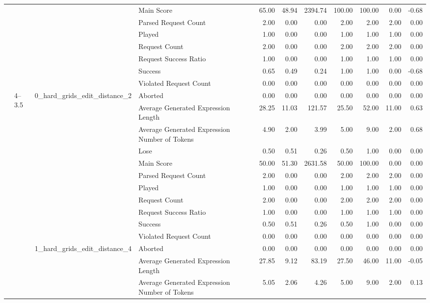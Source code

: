 \begin{tabular}{llllrrrrrrr}
 &  &  & Main Score & 65.00 & 48.94 & 2394.74 & 100.00 & 100.00 & 0.00 & -0.68 \\
 &  &  & Parsed Request Count & 2.00 & 0.00 & 0.00 & 2.00 & 2.00 & 2.00 & 0.00 \\
 &  &  & Played & 1.00 & 0.00 & 0.00 & 1.00 & 1.00 & 1.00 & 0.00 \\
 &  &  & Request Count & 2.00 & 0.00 & 0.00 & 2.00 & 2.00 & 2.00 & 0.00 \\
 &  &  & Request Success Ratio & 1.00 & 0.00 & 0.00 & 1.00 & 1.00 & 1.00 & 0.00 \\
 &  &  & Success & 0.65 & 0.49 & 0.24 & 1.00 & 1.00 & 0.00 & -0.68 \\
 &  &  & Violated Request Count & 0.00 & 0.00 & 0.00 & 0.00 & 0.00 & 0.00 & 0.00 \\
\cline{2-11} \cline{3-11}
 & \multirow[t]{22}{*}{4--3.5} & \multirow[t]{11}{*}{0_hard_grids_edit_distance_2} & Aborted & 0.00 & 0.00 & 0.00 & 0.00 & 0.00 & 0.00 & 0.00 \\
 &  &  & Average Generated Expression Length & 28.25 & 11.03 & 121.57 & 25.50 & 52.00 & 11.00 & 0.63 \\
 &  &  & Average Generated Expression Number of Tokens & 4.90 & 2.00 & 3.99 & 5.00 & 9.00 & 2.00 & 0.68 \\
 &  &  & Lose & 0.50 & 0.51 & 0.26 & 0.50 & 1.00 & 0.00 & 0.00 \\
 &  &  & Main Score & 50.00 & 51.30 & 2631.58 & 50.00 & 100.00 & 0.00 & 0.00 \\
 &  &  & Parsed Request Count & 2.00 & 0.00 & 0.00 & 2.00 & 2.00 & 2.00 & 0.00 \\
 &  &  & Played & 1.00 & 0.00 & 0.00 & 1.00 & 1.00 & 1.00 & 0.00 \\
 &  &  & Request Count & 2.00 & 0.00 & 0.00 & 2.00 & 2.00 & 2.00 & 0.00 \\
 &  &  & Request Success Ratio & 1.00 & 0.00 & 0.00 & 1.00 & 1.00 & 1.00 & 0.00 \\
 &  &  & Success & 0.50 & 0.51 & 0.26 & 0.50 & 1.00 & 0.00 & 0.00 \\
 &  &  & Violated Request Count & 0.00 & 0.00 & 0.00 & 0.00 & 0.00 & 0.00 & 0.00 \\
\cline{3-11}
 &  & \multirow[t]{11}{*}{1_hard_grids_edit_distance_4} & Aborted & 0.00 & 0.00 & 0.00 & 0.00 & 0.00 & 0.00 & 0.00 \\
 &  &  & Average Generated Expression Length & 27.85 & 9.12 & 83.19 & 27.50 & 46.00 & 11.00 & -0.05 \\
 &  &  & Average Generated Expression Number of Tokens & 5.05 & 2.06 & 4.26 & 5.00 & 9.00 & 2.00 & 0.13 \\

\end{tabular}
